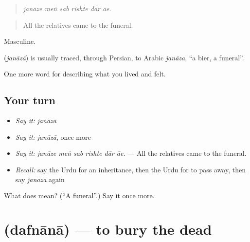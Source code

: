 \begin{quote}
     
\end{quote}

\begin{quote}
\emph{janāze meṅ sab rishte dār āe.}
\end{quote}

\begin{quote}
All the relatives came to the funeral.
\end{quote}

Masculine.

\begin{cousinweb}
\textbf{} (\emph{janāzā}) is usually traced, through Persian, to Arabic \emph{janāza}, \textquotedblleft{}a bier, a funeral\textquotedblright{}.
\end{cousinweb}

\begin{grammarlens}[title={What you've built}]
One more word for describing what you lived and felt.
\end{grammarlens}

\subsection*{Your turn}
\begin{itemize}
\raggedright
  \item \emph{Say it:} \emph{janāzā}
  \item \emph{Say it:} \emph{janāzā}, once more
  \item \emph{Say it:} \emph{janāze meṅ sab rishte dār āe.} — All the relatives came to the funeral.
  \item \emph{Recall:} say the Urdu for an inheritance, then the Urdu for to pass away, then say \emph{janāzā} again
\end{itemize}

\begin{tcolorbox}[breakable,colback=teal!4,colframe=teal!35!black,title={Before you move on}]
What does  mean? (\textquotedblleft{}A funeral\textquotedblright{}.) Say it once more.
\end{tcolorbox}
\section[\texorpdfstring{\ur{دفنانا} (dafnānā)}{دفنانا (dafnānā)}]{ (dafnānā) — to bury the dead}

\label{lesson:UR-C493-dafnana}



